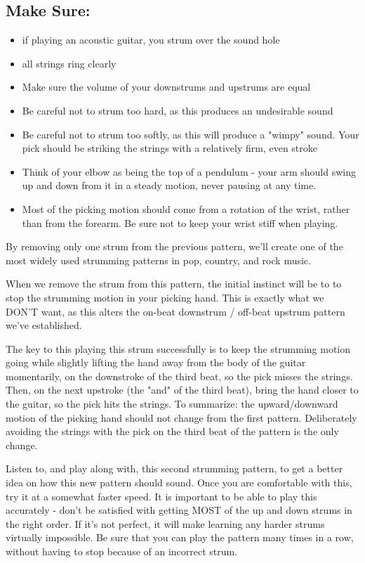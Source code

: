 \subsection{Make Sure:}
\begin{itemize}
\item if playing an acoustic guitar, you strum over the sound hole
\item all strings ring clearly
\item Make sure the volume of your downstrums and upstrums are equal
\item Be careful not to strum too hard, as this produces an undesirable sound
\item Be careful not to strum too softly, as this will produce a "wimpy" sound.
      Your pick should be striking the strings with a relatively firm, even stroke
\item Think of your elbow as being the top of a pendulum - your arm should
      swing up and down from it in a steady motion, never pausing at any time.
\item Most of the picking motion should come from a rotation of the wrist,
      rather than from the forearm. Be sure not to keep your wrist stiff when
      playing.
\end{itemize}
%
By removing only one strum from the previous pattern, we'll create one of the
most widely used strumming patterns in pop, country, and rock music.

When we remove the strum from this pattern, the initial instinct will be to to
stop the strumming motion in your picking hand. This is exactly what we DON'T
want, as this alters the on-beat downstrum / off-beat upstrum pattern we've
established.

The key to this playing this strum successfully is to keep the strumming motion
going while slightly lifting the hand away from the body of the guitar
momentarily, on the downstroke of the third beat, so the pick misses the
strings. Then, on the next upstroke (the "and" of the third beat), bring the
hand closer to the guitar, so the pick hits the strings. To summarize: the
upward/downward motion of the picking hand should not change from the first
pattern. Deliberately avoiding the strings with the pick on the third beat of
the pattern is the only change.

Listen to, and play along with, this second strumming pattern, to get a better
idea on how this new pattern should sound. Once you are comfortable with this,
try it at a somewhat faster speed. It is important to be able to play this
accurately - don't be satisfied with getting MOST of the up and down strums in
the right order. If it's not perfect, it will make learning any harder strums
virtually impossible. Be sure that you can play the pattern many times in a
row, without having to stop because of an incorrect strum.


